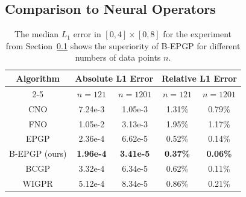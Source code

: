 \documentclass{article} %
\theoremstyle{plain}
\theoremstyle{definition}
\theoremstyle{remark}
\begin{document}
\subsection{Comparison to Neural Operators}\label{sec:comparison_no}

\begin{table}
\caption{The median \(L_1\) error in \([0,4]\times[0,8]\) for the experiment from Section~\ref{sec:comparison_no} shows the superiority of B-EPGP for different numbers of data points $n$.}
\label{tab:NO}
\centering
\begin{tabular}{|c||c|c|c|c|}
\hline
\multirow{2}{*}{Algorithm} &\multicolumn{2}{c|}{Absolute L1 Error} &\multicolumn{2}{c|}{Relative L1 Error}\\
\cline{2-5}
&$n=121$ & $n=1201$ & $n=121$ & $n=1201$\\
\hline
\small{CNO} &7.24e-3 &1.05e-3 & 1.31\% &0.79\%\\
\small{FNO} &1.05e-2 &3.13e-3 & 1.95\% &1.17\%\\
\small{EPGP} &2.36e-4 &6.62e-5 &0.52\% &0.14\%\\
\small{B-EPGP (ours)} & \textbf{1.96e-4} & \textbf{3.41e-5} & \textbf{0.37\%} & \textbf{0.06\%}\\
\small{BCGP} &3.32e-4 & 6.34e-5 & 0.62\% & 0.11\% \\
\small{WIGPR} &5.12e-4 & 8.34e-5 & 0.86\% & 0.21\% \\
\hline
\end{tabular}
\end{table}
\end{document}
